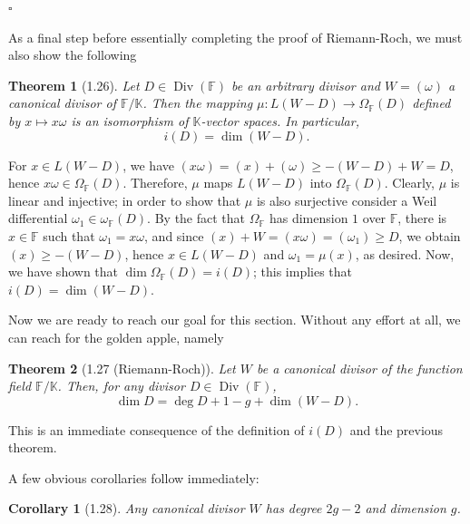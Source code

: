 \documentclass[11pt]{article}
\makeatletter
\theoremstyle{scplain}
\newtheorem*{theorem}{Theorem}
\newtheorem*{corollary}{Corollary}
\renewenvironment{proof}[1][\proofname]{%
  \par\pushQED{\qed}\normalfont\topsep6\p@\@plus6\p@\relax
  \trivlist\item[\hskip\labelsep\scshape #1\@addpunct{.}]\ignorespaces}%
  {\popQED\endtrivlist\@endpefalse}
\DeclareMathOperator{\Div}{Div}
\makeatother
\begin{document}
\setlength{\emergencystretch}{2em}

\begin{flushright}$\square$\end{flushright}

As a final step before essentially completing the proof of Riemann-Roch, we
must also show the following

\begin{theorem}[1.26]
Let $D \in \Div(\mathbb{F})$ be an arbitrary divisor and $W=(\omega)$ a
canonical divisor of $\mathbb{F}/\mathbb{K}$. Then the mapping
$\mu : L(W-D) \longrightarrow \Omega_{\mathbb{F}}(D)$ defined by
$x \mapsto x\omega$ is an isomorphism of $\mathbb{K}$-vector spaces. In
particular,
\[
  i(D)=\dim(W-D).
\]
\end{theorem}

\begin{proof}
For $x \in L(W-D)$, we have
$(x\omega)=(x)+(\omega) \geq -(W-D)+W=D$, hence
$x\omega \in \Omega_{\mathbb{F}}(D)$. Therefore, $\mu$ maps $L(W-D)$ into
$\Omega_{\mathbb{F}}(D)$. Clearly, $\mu$ is linear and injective; in order to
show that $\mu$ is also surjective consider a Weil differential
$\omega_1 \in \omega_{\mathbb{F}}(D)$. By the fact that
$\Omega_{\mathbb{F}}$ has dimension $1$ over $\mathbb{F}$, there is
$x \in \mathbb{F}$ such that $\omega_1=x\omega$, and since
$(x)+W=(x\omega)=(\omega_1) \geq D$, we obtain $(x) \geq -(W-D)$, hence
$x \in L(W-D)$ and $\omega_1=\mu(x)$, as desired. Now, we have shown that
$\dim\Omega_{\mathbb{F}}(D)=i(D)$; this implies that $i(D)=\dim(W-D)$.
\end{proof}

Now we are ready to reach our goal for this section. Without any effort at all,
we can reach for the golden apple, namely

\begin{theorem}[1.27 (Riemann-Roch)]
Let $W$ be a canonical divisor of the function field
$\mathbb{F}/\mathbb{K}$. Then, for any divisor $D \in \Div(\mathbb{F})$,
\[
  \dim D=\deg D+1-g+\dim(W-D).
\]
\end{theorem}

\begin{proof}
This is an immediate consequence of the definition of $i(D)$ and the previous
theorem.
\end{proof}

A few obvious corollaries follow immediately:

\begin{corollary}[1.28]
Any canonical divisor $W$ has degree $2g-2$ and dimension $g$.
\end{corollary}
\end{document}
